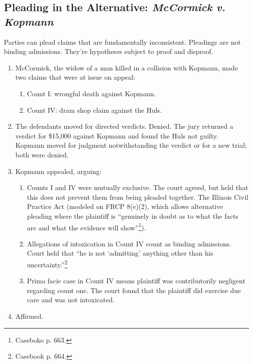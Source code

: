\subsection{Pleading in the Alternative: \emph{McCormick v. Kopmann}}

Parties can plead claims that are fundamentally inconsistent. Pleadings are 
not binding admissions. They're hypotheses subject to proof and disproof.

\begin{enumerate}
    \item McCormick, the widow of a man killed in a collision with Kopmann, 
    made two claims that were at issue on appeal:
    \begin{enumerate}
        \item Count I: wrongful death against Kopmann.
        \item Count IV: dram shop claim against the Huls.
    \end{enumerate}
    \item The defendants moved for directed verdicts. Denied. The jury 
    returned a verdict for \$15,000 against Kopmann and found the Huls not 
    guilty. Kopmann moved for judgment notwithstanding the verdict or for a 
    new trial; both were denied.
    \item Kopmann appealed, arguing:
    \begin{enumerate}
        \item Counts I and IV were mutually exclusive. The court agreed, but 
        held that this does not prevent them from being pleaded together. The 
        Illinois Civil Practice Act (modeled on FRCP 8(e)(2), which allows 
        alternative pleading where the plaintiff is ``genuinely in doubt as to 
        what the facts are and what the evidence will 
        show''\footnote{Caseboko p. 663.}).
        \item Allegations of intoxication in Count IV count as binding 
        admissions. Court held that ``he is not `admitting' anything other 
        than his uncertainty.''\footnote{Casebook p. 664.}
        \item Prima facie case in Count IV means plaintiff was contributorily 
        negligent regarding count one. The court found that the plaintiff did 
        exercise due care and was not intoxicated.
    \end{enumerate}
    \item Affirmed.
\end{enumerate}

